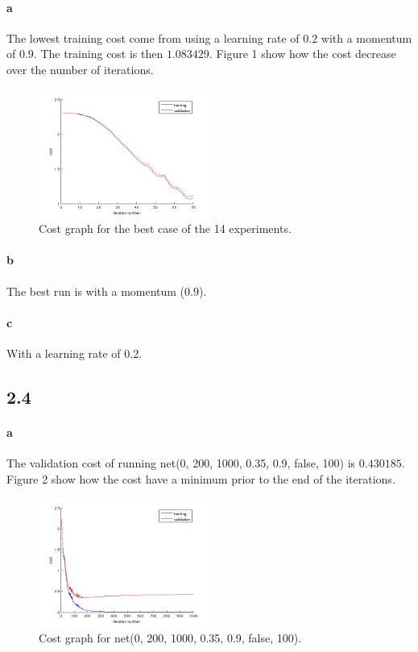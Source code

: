 \documentclass{article}
\begin{document}
\paragraph{a}
The lowest training cost come from using a learning rate of $0.2$ with a momentum of $0.9$.
The training cost is then $1.083429$. Figure 1 show how the cost decrease over the number of iterations.


\begin{figure}[h!]
  \centering
    \includegraphics[width=0.5\textwidth]{pics/prob23a.png}
    \caption{Cost graph for the best case of the 14 experiments.}
\end{figure}

\paragraph{b}

The best run is with a momentum ($0.9$).

\paragraph{c}

With a learning rate of $0.2$.

\subsection*{2.4}

\paragraph{a}

The validation cost of running net(0, 200, 1000, 0.35, 0.9, false, 100) is
$0.430185$. Figure 2 show how the cost have a minimum prior to the end of the iterations.

\begin{figure}[h!]
  \centering
    \includegraphics[width=0.5\textwidth]{pics/prob24a.png}
    \caption{Cost graph for net(0, 200, 1000, 0.35, 0.9, false, 100).}
\end{figure}
\end{document}
